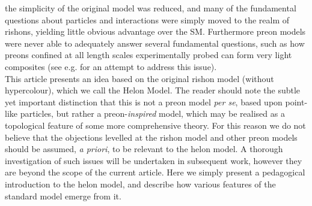 \documentclass[twocolumn,showpacs,preprintnumbers,amsmath,amssymb]{revtex4}
\begin{document}
the simplicity of the original model was reduced, and many of the fundamental 
questions about particles and interactions were simply moved to the realm of rishons,
yielding little obvious advantage over the SM. Furthermore preon models were never able 
to adequately answer several fundamental questions, such as how preons confined at all 
length scales experimentally probed can form very light composites (see e.g. 
\cite{mismatch} for an attempt to address this issue).\\ 
This article presents an idea based on the original rishon model (without 
hypercolour), which we call the Helon Model. The reader should note the subtle
yet important distinction that this is not a preon model {\em per se}, based upon 
point-like particles, but rather a preon-{\em inspired} model, which may be realised 
as a topological feature of some more comprehensive theory. For this reason we do not 
believe that the objections levelled at the rishon model and other preon models should 
be assumed, {\em a priori}, to be relevant to the helon model. A thorough investigation 
of such issues will be undertaken in subsequent work, however they are beyond the scope 
of the current article. Here we simply present a pedagogical introduction to the helon 
model, and describe how various features of the standard model emerge from it.
\end{document}
